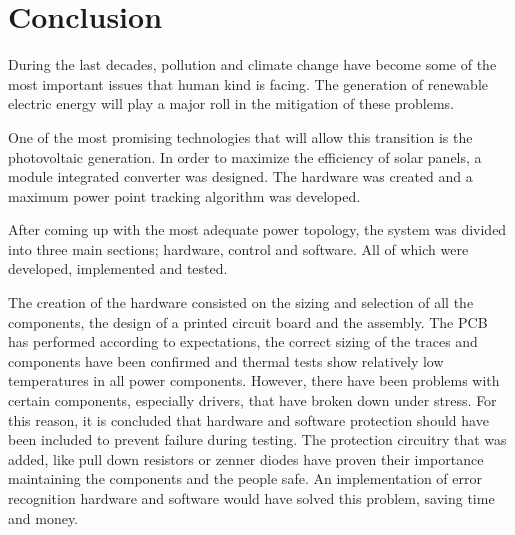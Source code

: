 \chapter{Conclusion}\label{ch:conclusion}






During the last decades, pollution and climate change have become some of the most important issues that human kind is facing. The generation of renewable electric energy will play a major roll in the mitigation of these problems.

One of the most promising technologies that will allow this transition is the photovoltaic generation. 
In order to maximize the efficiency of solar panels, a module integrated converter was designed.
The hardware was created and a maximum power point tracking algorithm was developed.

After coming up with the most adequate power topology, the system was divided into three main sections; hardware, control and software. All of which were developed, implemented and tested.

The creation of the hardware consisted on the sizing and selection of all the components, the design of a printed circuit board and the assembly. 
The PCB has performed according to expectations, the correct sizing of the traces and components have  been confirmed and thermal tests show relatively low temperatures in all power components. 
However, there have been problems with certain components, especially drivers, that have broken down under stress. For this reason, it is concluded that hardware and software protection should have been included to prevent failure during testing.
The protection circuitry that was added, like pull down resistors or zenner diodes have proven their importance maintaining the components and the people safe. An implementation of error recognition hardware and software would have solved this problem, saving time and money.

